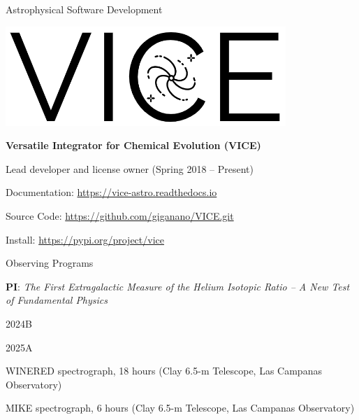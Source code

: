 \documentclass[cv.tex]{subfiles}
\begin{document}
\vspace{4mm}
\noindent
{\color{themecolor} \large Astrophysical Software Development}
\par\noindent
\parbox{0.35\textwidth}{%
	\centering
	\includegraphics[scale = 0.33]{vice-logo.png}
}
\parbox{0.63\textwidth}{%
	\textbf{Versatile Integrator for Chemical Evolution (VICE)} \par
	Lead developer and license owner (Spring 2018 -- Present) \par
	Documentation: \url{https://vice-astro.readthedocs.io} \par
	Source Code: \url{https://github.com/giganano/VICE.git} \par
	Install: \url{https://pypi.org/project/vice}
}

\vspace{4mm}
\noindent
{\color{themecolor} \large Observing Programs}
\par\noindent
\textbf{PI}: \textit{The First Extragalactic Measure of the Helium Isotopic
Ratio -- A New Test of Fundamental Physics}
\par \noindent
\parbox{0.18\textwidth}{%
	\raggedleft
	2024B \par
	2025A
}
\hspace{1mm}
\parbox{0.8\textwidth}{%
	WINERED spectrograph, 18 hours (Clay 6.5-m Telescope, Las Campanas
	Observatory) \par
	MIKE spectrograph, 6 hours (Clay 6.5-m Telescope, Las Campanas Observatory)
}
\end{document}
